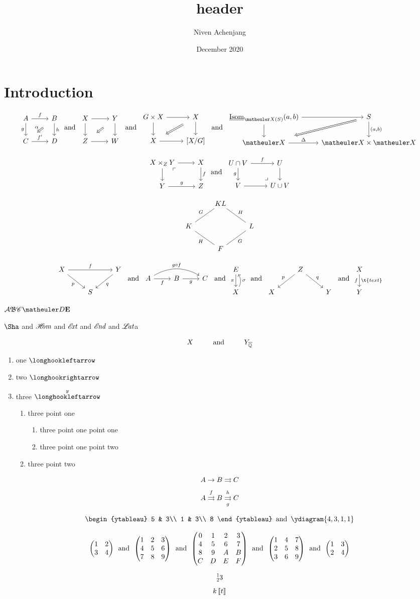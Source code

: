 \documentclass{article}
\title{header}
\author{Niven Achenjang}
\date{December 2020}
\numberwithin{thm}{section}
\numberwithin{prob}{section}
\numberwithin{equation}{section}
\begin{document}
\maketitle

\section{Introduction}

$$\twocommsquare AfBghC{f'}D\alpha\tand\baretwocommsquare XYZW\tand\baretwocommsquare{G\by X}XX{[X/G]}\tand\twocommsquare{\ul\Isom_{\meX(S)}(a,b)}{}S{}{(a,b)}\meX\Delta{\meX\by\meX}{}$$

$$\pullback {X\by_ZY}XfYgZ\tand\pushout {U\cap V}fUgV{U\cup V}$$

$$\galoisdiamond{KL}GHKLHGF$$

$$\mapover XfYpqS\tand\compdiag AfBgC{g\circ f}\tand\mapwithsect E\pi X\sigma\tand\correspondence ZpqXY\tand\mapdown Xf{\t{text}}Y$$

$\mcA\mf B\msC\meD\mbf E$

$\Sha$ and $\sHom$ and $\sExt$ and $\sEnd$ and $\sLat$a

$$X\Text{and}\sspacing Y_\Qbar$$

\begin{enumerate}
    \item one $\fintoo$
    \item two $\intoo$
    \item three $\xfintoo{y}$
    \begin{enumerate}
        \item three point one
        \begin{enumerate}
            \item three point one point one
            \item three point one point two
        \end{enumerate}
        \item three point two
    \end{enumerate}
\end{enumerate}
$$A\to B\toto C$$
$$A \xtoto fB \xtoto[g]h C$$

$$\begin{ytableau}
    5 & 3\\
    1 & 3\\
    8
\end{ytableau}\tand\ydiagram{4,3,1,1}$$

$$\mat1234\tand\Mat123456789\tand\MAT0123456789ABCDEF\tand\Matt123456789\tand\matt1234$$

$$\prescript123$$
$$k\dsq t$$
\end{document}

